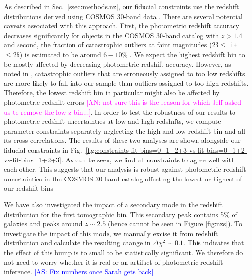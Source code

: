 \documentclass[a4paper,11pt]{article}
\newcommand{\as}[1]{{\textcolor{blue}{[AS: #1]}}}
\newcommand{\an}[1]{{\textcolor{magenta}{[AN: #1]}}}
\begin{document}
As described in Sec.~\ref{ssec:methods.nz}, our fiducial constraints use the redshift distributions derived using COSMOS 30-band data \cite{2016ApJS..224...24L}. There are several potential caveats associated with this approach. First, the   photometric redshift accuracy decreases significantly for objects in the COSMOS 30-band catalog with $z > 1.4$ and second, the fraction of catastrophic outliers at faint magnitudes ($23 \leq$ \texttt{i+} $\leq 25$) is estimated to be around $6-10 \%$ \cite{2016ApJS..224...24L}. We expect the highest redshift bin to be mostly affected by decreasing photometric redshift accuracy. However, as noted in \cite{Joudaki:2019}, catastrophic outliers that are erroneously assigned to too low redshifts are more likely to fall into our sample than outliers assigned to too high redshifts. Therefore, the lowest redshift bin in particular might also be affected by photometric redshift errors \an{not sure this is the reason for which Jeff asked us to remove the low-z bin...}. In order to test the robustness of our results to photometric redshift uncertainties at low and high redshifts, we compute parameter constraints separately neglecting the high and low redshift bin and all its cross-correlations. The results of these two analyses are shown alongside our fiducial constraints in Fig.~\ref{fig:constraints-fit-bins=0+1+2+3-vs-fit-bins=0+1+2-vs-fit-bins=1+2+3}. As can be seen, we find all constraints to agree well with each other. This suggests that our analysis is robust against photometric redshift uncertainties in the COSMOS 30-band catalog affecting the lowest or highest of our redshift bins. 

We have also investigated the impact of a secondary mode in the redshift distribution for the first tomographic bin. This secondary peak contains 5\% of galaxies and peaks around $z\sim 2.5$ (hence cannot be seen in Figure \ref{fig:nzs}). To investigate the impact of this mode, we manually excise it from redshift distribution and calculate the resulting change in $\Delta \chi^2\sim 0.1$. This indicates that the effect of this bump is to small to be statistically significant. We therefore do not need to worry whether it is real or an artifact of photometric redshift inference.  \as{Fix numbers once Sarah gets back}
\end{document}
